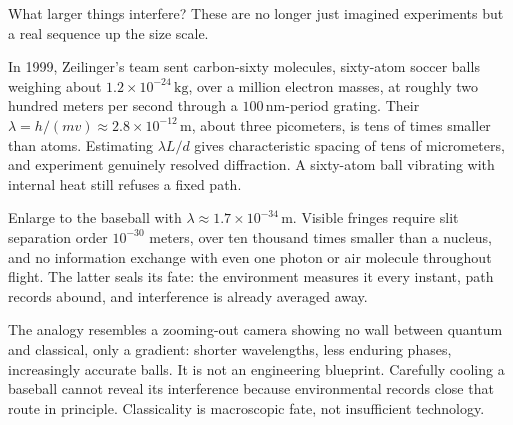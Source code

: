 \begin{thought}
What larger things interfere? These are no longer just imagined experiments but a real sequence up the size scale.

In 1999, Zeilinger's team sent carbon-sixty molecules, sixty-atom soccer balls weighing about \(1.2\times10^{-24}\,\mathrm{kg}\), over a million electron masses, at roughly two hundred meters per second through a \(100\,\mathrm{nm}\)-period grating. Their \(\lambda = h/(mv) \approx 2.8\times10^{-12}\,\mathrm{m}\), about three picometers, is tens of times smaller than atoms. Estimating \(\lambda L/d\) gives characteristic spacing of tens of micrometers, and experiment genuinely resolved diffraction. A sixty-atom ball vibrating with internal heat still refuses a fixed path.

Enlarge to the baseball with \(\lambda \approx 1.7\times10^{-34}\,\mathrm{m}\). Visible fringes require slit separation order \(10^{-30}\) meters, over ten thousand times smaller than a nucleus, and no information exchange with even one photon or air molecule throughout flight. The latter seals its fate: the environment measures it every instant, path records abound, and interference is already averaged away.

The analogy resembles a zooming-out camera showing no wall between quantum and classical, only a gradient: shorter wavelengths, less enduring phases, increasingly accurate balls. It is not an engineering blueprint. Carefully cooling a baseball cannot reveal its interference because environmental records close that route in principle. Classicality is macroscopic fate, not insufficient technology.
\end{thought}


